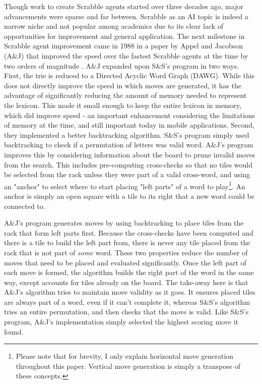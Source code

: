 \documentclass[letterpaper]{article}
\begin{document}
Though work to create Scrabble agents started over three decades ago, major advancements were sparse and far between. Scrabble as an AI topic is indeed a narrow niche and not popular among academics due to its clear lack of opportunities for improvement and general application. The next milestone in Scrabble agent improvement came in 1988 in a paper by Appel and Jacobson (A\&J) that improved the speed over the fastest Scrabble agents at the time by two orders of magnitude \cite{Appel1988}. A\&J expanded upon S\&S's program in two ways. First, the trie is reduced to a Directed Acyclic Word Graph (DAWG). While this does not directly improve the speed in which moves are generated, it has the advantage of significantly reducing the amount of memory needed to represent the lexicon. This made it small enough to keep the entire lexicon in memory, which did improve speed - an important enhancement considering the limitations of memory at the time, and still important today in mobile applications. Second, they implemented a better backtracking algorithm. S\&S's program simply used backtracking to check if a permutation of letters was valid word. A\&J's program improves this by considering information about the board to prune invalid moves from the search. This includes pre-computing cross-checks so that no tiles would be selected from the rack unless they were part of a valid cross-word, and using an "anchor" to select where to start placing "left parts" of a word to play\footnote{Please note that for brevity, I only explain horizontal move generation throughout this paper. Vertical move generation is simply a transpose of these concepts.}. An anchor is simply an open square with a tile to its right that a new word could be connected to.

A\&J's program generates moves by using backtracking to place tiles from the rack that form left parts first. Because the cross-checks have been computed and there is a tile to build the left part from, there is never any tile placed from the rack that is not part of \emph{some} word. These two properties reduce the number of moves that need to be placed and evaluated significantly. Once the left part of each move is formed, the algorithm builds the right part of the word in the same way, except accounts for tiles already on the board. The take-away here is that A\&J's algorithm tries to maintain move validity as it goes. It ensures placed tiles are always part of a word, even if it can't complete it, whereas S\&S's algorithm tries an entire permutation, and then checks that the move is valid. Like S\&S's program, A\&J's implementation simply selected the highest scoring move it found.
\end{document}
